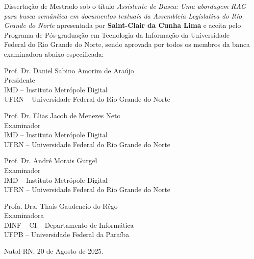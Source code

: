 \begin{folhadeaprovacao}
	
	\noindent 
	Dissertação de Mestrado sob o título \textit{Assistente de Busca: Uma abordagem RAG para busca semântica em documentos textuais da Assembleia Legislativa do Rio Grande do Norte} apresentada por \textbf{Saint-Clair da Cunha Lima} e aceita pelo Programa de Pós-graduação em Tecnologia da Informação da Universidade Federal do Rio Grande do Norte, sendo aprovada por todos os membros da banca examinadora abaixo especificada:
		
	\assinatura
	{
		Prof. Dr. Daniel Sabino Amorim de Araújo \\
		{\small Presidente} \smallskip \\ 
		{\footnotesize
			IMD -- Instituto Metrópole Digital \\ 
		  UFRN -- Universidade Federal do Rio Grande do Norte
		}
   }
      
   \assinatura
	{
		Prof. Dr. Elias Jacob de Menezes Neto \\
		{\small Examinador} \smallskip\\ 
		{\footnotesize
			IMD -- Instituto Metrópole Digital \\ 
		  UFRN -- Universidade Federal do Rio Grande do Norte 
		}
   }   
      
   \assinatura
	{
		Prof. Dr. André Morais Gurgel \\
		{\small Examinador} \smallskip\\ 
		{\footnotesize
			IMD -- Instituto Metrópole Digital \\ 
		  UFRN -- Universidade Federal do Rio Grande do Norte 
		}
   }   
   
   \assinatura
	{
		Profa. Dra. Thaís Gaudencio do Rêgo \\
		{\small Examinadora} \smallskip\\ 
	    {\footnotesize
			DINF -- CI -- Departamento de Informática \\
			UFPB -- Universidade Federal da Paraíba \\
		}
	}
	
	\vfill
	
	\begin{center}
		Natal-RN, 20 de Agosto de 2025.
	\end{center}
\end{folhadeaprovacao}


